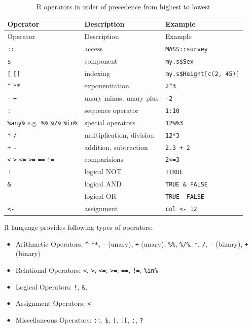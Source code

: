 \documentclass[
]{book}
\providecommand{\tightlist}{%
  \setlength{\itemsep}{0pt}\setlength{\parskip}{0pt}}
\begin{document}
\begin{longtable}[]{@{}lll@{}}
\caption{R operators in order of precedence from highest to lowest}\tabularnewline
\toprule
Operator & Description & Example\tabularnewline
\midrule
\endfirsthead
\toprule
Operator & Description & Example\tabularnewline
\midrule
\endhead
\texttt{::} & access & \texttt{MASS::survey}\tabularnewline
\texttt{\$} & component & \texttt{my.s\$Sex}\tabularnewline
\texttt{{[}} \texttt{{[}{[}} & indexing & \texttt{my.s\$Height{[}c(2,\ 45){]}}\tabularnewline
\texttt{\^{}} \texttt{**} & exponentiation & \texttt{2\^{}3}\tabularnewline
\texttt{-} \texttt{+} & unary minus, unary plus & \texttt{-2}\tabularnewline
\texttt{:} & sequence operator & \texttt{1:10}\tabularnewline
\texttt{\%any\%} e.g.~\texttt{\%\%} \texttt{\%/\%} \texttt{\%in\%} & special operators & \texttt{12\%\%3}\tabularnewline
\texttt{*} \texttt{/} & multiplication, division & \texttt{12*3}\tabularnewline
\texttt{+} \texttt{-} & addition, subtraction & \texttt{2.3\ +\ 2}\tabularnewline
\texttt{\textless{}} \texttt{\textgreater{}} \texttt{\textless{}=} \texttt{\textgreater{}=} \texttt{==} \texttt{!=} & comparisions & \texttt{2\textless{}=3}\tabularnewline
\texttt{!} & logical NOT & \texttt{!TRUE}\tabularnewline
\texttt{\&} & logical AND & \texttt{TRUE\ \&\ FALSE}\tabularnewline
\texttt{\textbar{}} & logical OR & \texttt{TRUE\ \textbar{}\ FALSE}\tabularnewline
\texttt{\textless{}-} & assignment & \texttt{col\ \textless{}-\ 12}\tabularnewline
\bottomrule
\end{longtable}

R language provides following types of operators:

\begin{itemize}
\tightlist
\item
  Arithmetic Operators: \texttt{\^{}} \texttt{**}, \texttt{-} (unary), \texttt{+} (unary), \texttt{\%\%}, \texttt{\%/\%}, \texttt{*}, \texttt{/}, \texttt{-} (binary), \texttt{+} (binary)
\item
  Relational Operators: \texttt{\textless{}}, \texttt{\textgreater{}}, \texttt{\textless{}=}, \texttt{\textgreater{}=}, \texttt{==}, \texttt{!=}, \texttt{\%in\%}
\item
  Logical Operators: \texttt{!}, \texttt{\&}, \texttt{\textbar{}}
\item
  Assignment Operators: \texttt{\textless{}-}
\item
  Miscellaneous Operators: \texttt{::}, \texttt{\$}, \texttt{{[}}, \texttt{{[}{[}}, \texttt{:}, \texttt{?}
\end{itemize}
\end{document}

